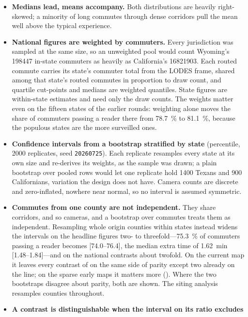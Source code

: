 \documentclass[11pt,twoside]{article}
\begin{document}
\begin{itemize}
  \item \textbf{Medians lead, means accompany.} Both distributions are heavily
    right-skewed; a minority of long commutes through dense corridors pull the mean well
    above the typical experience.
  \item \textbf{National figures are weighted by commuters.} Every jurisdiction was sampled
    at the same size, so an unweighted pool would count Wyoming's \num{198447} in-state
    commuters as heavily as California's \num{16821903}. Each routed commute carries its
    state's commuter total from the LODES frame, shared among that state's routed commutes in
    proportion to draw count, and quartile cut-points and medians are weighted quantiles.
    State figures are within-state estimates and need only the draw counts. The weights
    matter even on the fifteen states of the earlier rounds: weighting alone moves the share
    of commuters passing a reader there from \SI{78.7}{\percent} to \SI{81.1}{\percent},
    because the populous states are the more surveilled ones.
  \item \textbf{Confidence intervals from a bootstrap stratified by state}
    \citep{efron1993} (percentile, \num{2000} replicates, seed \texttt{20260725}). Each
    replicate resamples every state at its own size and re-derives its weights, as the sample
    was drawn; a plain bootstrap over pooled rows would let one replicate hold \num{1400}
    Texans and 900 Californians, variation the design does not have. Camera counts are
    discrete and zero-inflated, nowhere near normal, so no interval is assumed symmetric.
  \item \textbf{Commutes from one county are not independent.} They share corridors, and so
    cameras, and a bootstrap over commutes treats them as independent. Resampling whole origin
    counties within states instead \citep{field2007} widens the intervals on the headline
    figures two- to threefold---\SI{75.3}{\percent} of commuters passing a reader becomes
    [74.0--76.4], the median extra time of \SI{1.62}{\minute} [1.48--1.84]---and on the
    national contrasts about twofold. On the current map it leaves every contrast of
     on the same side of parity
    except two already on the line; on the sparse early maps it matters more
    (). Where the two bootstraps disagree about parity, both are
    shown. The siting analysis resamples counties throughout.
  \item \textbf{A contrast is distinguishable when the interval on its ratio excludes
}
\end{itemize}
\end{document}
